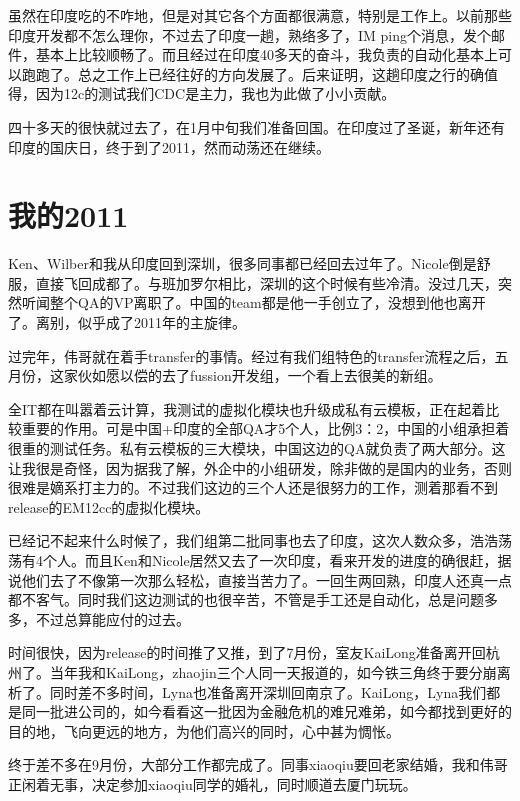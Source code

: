 虽然在印度吃的不咋地，但是对其它各个方面都很满意，特别是工作上。以前那些印度开发都不怎么理你，不过去了印度一趟，熟络多了，IM ping个消息，发个邮件，基本上比较顺畅了。而且经过在印度40多天的奋斗，我负责的自动化基本上可以跑跑了。总之工作上已经往好的方向发展了。后来证明，这趟印度之行的确值得，因为12c的测试我们CDC是主力，我也为此做了小小贡献。

四十多天的很快就过去了，在1月中旬我们准备回国。在印度过了圣诞，新年还有印度的国庆日，终于到了2011，然而动荡还在继续。


\newpage
\section*{我的2011}

Ken、Wilber和我从印度回到深圳，很多同事都已经回去过年了。Nicole倒是舒服，直接飞回成都了。与班加罗尔相比，深圳的这个时候有些冷清。没过几天，突然听闻整个QA的VP离职了。中国的team都是他一手创立了，没想到他也离开了。离别，似乎成了2011年的主旋律。

过完年，伟哥就在着手transfer的事情。经过有我们组特色的transfer流程之后，五月份，这家伙如愿以偿的去了fussion开发组，一个看上去很美的新组。

全IT都在叫嚣着云计算，我测试的虚拟化模块也升级成私有云模板，正在起着比较重要的作用。可是中国+印度的全部QA才5个人，比例3：2，中国的小组承担着很重的测试任务。私有云模板的三大模块，中国这边的QA就负责了两大部分。这让我很是奇怪，因为据我了解，外企中的小组研发，除非做的是国内的业务，否则很难是嫡系打主力的。不过我们这边的三个人还是很努力的工作，测着那看不到release的EM12cc的虚拟化模块。

已经记不起来什么时候了，我们组第二批同事也去了印度，这次人数众多，浩浩荡荡有4个人。而且Ken和Nicole居然又去了一次印度，看来开发的进度的确很赶，据说他们去了不像第一次那么轻松，直接当苦力了。一回生两回熟，印度人还真一点都不客气。同时我们这边测试的也很辛苦，不管是手工还是自动化，总是问题多多，不过总算能应付的过去。

时间很快，因为release的时间推了又推，到了7月份，室友KaiLong准备离开回杭州了。当年我和KaiLong，zhaojin三个人同一天报道的，如今铁三角终于要分崩离析了。同时差不多时间，Lyna也准备离开深圳回南京了。KaiLong，Lyna我们都是同一批进公司的，如今看看这一批因为金融危机的难兄难弟，如今都找到更好的目的地，飞向更远的地方，为他们高兴的同时，心中甚为惆怅。

终于差不多在9月份，大部分工作都完成了。同事xiaoqiu要回老家结婚，我和伟哥正闲着无事，决定参加xiaoqiu同学的婚礼，同时顺道去厦门玩玩。

